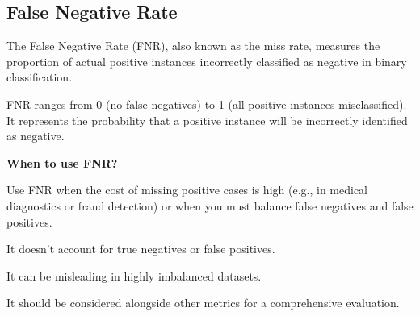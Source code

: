 \subsection{False Negative Rate}
\thispagestyle{classificationstyle}

The False Negative Rate (FNR), also known as the miss rate, measures the proportion of actual positive instances incorrectly classified as negative in binary classification.
\begin{center}
\end{center}

FNR ranges from 0 (no false negatives) to 1 (all positive instances misclassified). It represents the probability that a positive instance will be incorrectly identified as negative.

\textbf{When to use FNR?}

Use FNR when the cost of missing positive cases is high (e.g., in medical diagnostics or fraud detection) or when you must balance false negatives and false positives.

{
\item It doesn't account for true negatives or false positives.
\item It can be misleading in highly imbalanced datasets.
\item It should be considered alongside other metrics for a comprehensive evaluation.
}


\clearpage
\thispagestyle{customstyle}



